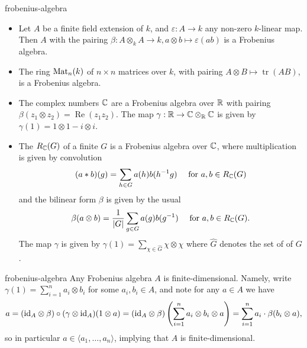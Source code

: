 \begin{example}{frobenius-algebra}
    \begin{itemize}
        \item Let $A$ be a finite field extension of $k$, and $\varepsilon : A \to k$ any non-zero $k$-linear map. Then $A$ with the pairing $\beta : A \otimes_k A \to k, a \otimes b \mapsto \varepsilon(ab)$ is a Frobenius algebra.
        \item The ring $\textup{Mat}_n(k)$ of $n \times n$ matrices over $k$, with pairing $A \otimes B \mapsto \operatorname{tr}(AB)$, is a Frobenius algebra.
        \item The complex numbers $\mathbb{C}$ are a Frobenius algebra over $\mathbb{R}$ with pairing $\beta(z_1 \otimes z_2) = \operatorname{Re}(z_1 z_2)$. The map $\gamma : \mathbb{R} \to \mathbb{C} \otimes_{\mathbb{R}} \mathbb{C}$ is given by $\gamma(1) = 1 \otimes 1 - i \otimes i$.
        \item The  $R_{\mathbb{C}}(G)$ of a finite  $G$ is a Frobenius algebra over $\mathbb{C}$, where multiplication is given by convolution
        \[ (a * b)(g) = \sum_{h \in G} a(h) b(h^{-1} g) \quad \textup{ for } a, b \in R_{\mathbb{C}}(G) \]
        and the bilinear form $\beta$ is given by the usual 
        \[ \beta(a \otimes b) = \frac{1}{|G|} \sum_{g \in G} a(g) b(g^{-1}) \quad \textup{ for } a, b \in R_{\mathbb{C}}(G) . \]
        The map $\gamma$ is given by $\gamma(1) = \sum_{\chi \in \hat{G}} \chi \otimes \chi$ where $\hat{G}$ denotes the set of  of $G$.
    \end{itemize}
\end{example}

\begin{example}{frobenius-algebra}
    Any Frobenius algebra $A$ is finite-dimensional. Namely, write $\gamma(1) = \sum_{i = 1}^{n} a_i \otimes b_i$ for some $a_i, b_i \in A$, and note for any $a \in A$ we have
    \[ a = (\textup{id}_A \otimes \beta) \circ (\gamma \otimes \textup{id}_A)(1 \otimes a) = (\textup{id}_A \otimes \beta) \left( \sum_{i = 1}^{n} a_i \otimes b_i \otimes a \right) = \sum_{i = 1}^{n} a_i \cdot \beta(b_i \otimes a) , \]
    so in particular $a \in \langle a_1, \ldots, a_n \rangle$, implying that $A$ is finite-dimensional.
\end{example}


